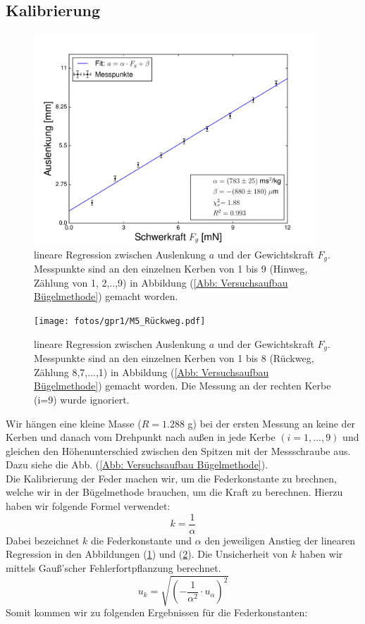 \documentclass[bibliography=totocnumbered]{scrartcl}
\begin{document}
		\subsection{Kalibrierung}

		
			\begin{figure}[ht!]
			\centering
			\includegraphics[width=300pt]{fotos/gpr1/M5_Hinweg.pdf}
			\caption[Regression 1]{lineare Regression zwischen Auslenkung $ a $ und der Gewichtskraft $ F_{g} $. Messpunkte sind an den einzelnen Kerben von 1 bis 9 (Hinweg, Zählung von 1, 2,..,9) in Abbildung (\ref{Abb: Versuchsaufbau Bügelmethode}) gemacht worden. }
			\label{Abb: Hinweg}
		\end{figure}
		
		
		\begin{figure}[ht!]
			\centering
			\texttt{[image: fotos/gpr1/M5\_Rückweg.pdf]}
			\caption[Regression 2]{lineare Regression zwischen Auslenkung $ a $ und der Gewichtskraft $ F_{g} $. Messpunkte sind an den einzelnen Kerben von 1 bis 8 (Rückweg, Zählung 8,7,...,1) in Abbildung (\ref{Abb: Versuchsaufbau Bügelmethode}) gemacht worden. Die Messung an der rechten Kerbe (i=9) wurde ignoriert.}
			\label{Abb: Rückweg}
		\end{figure}
	
	\newpage
	Wir hängen eine kleine Masse ($ R=1.288 $ g) bei der ersten Messung an keine der Kerben und danach vom Drehpunkt nach außen in jede Kerbe $ (i=1,...,9) $ und gleichen den Höhenunterschied zwischen den Spitzen mit der Messschraube aus. Dazu siehe die Abb. (\ref{Abb: Versuchsaufbau Bügelmethode}). \\Die Kalibrierung der Feder machen wir, um die Federkonstante zu brechnen, welche wir in der Bügelmethode brauchen, um die Kraft zu berechnen. Hierzu haben wir folgende Formel verwendet:
	\begin{equation}\label{eq: Federkonstante k}
		k=\dfrac{1}{\alpha}
	\end{equation}
Dabei bezeichnet $ k $ die Federkonstante und $ \alpha $ den jeweiligen Anstieg der linearen Regression in den Abbildungen (\ref{Abb: Hinweg}) und (\ref{Abb: Rückweg}). Die Unsicherheit von $ k $ haben wir mittels Gauß'scher Fehlerfortpflanzung berechnet.
		\begin{equation}\label{eq: Fehler Federkonstante}
			u_{k}=\sqrt{\left(-\dfrac{1}{\alpha^{2}}\cdot u_{\alpha}\right)^{2}}
		\end{equation}
	Somit kommen wir zu folgenden Ergebnissen für die Federkonstanten:
\end{document}
